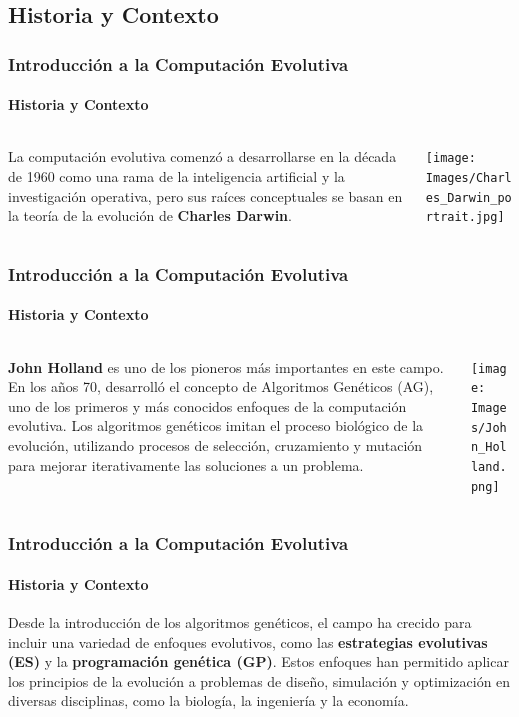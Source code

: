 \documentclass[
	11pt, %
]{beamer}
\begin{document}
\subsection{Historia y Contexto}
\begin{frame}
	\frametitle{Introducción a la Computación Evolutiva}
	\framesubtitle{Historia y Contexto}
	\begin{columns}[c] %
		\begin{column}{0.45\textwidth} %
                La computación evolutiva comenzó a desarrollarse en la década de 1960 como una rama de la inteligencia artificial y la investigación operativa, pero sus raíces conceptuales se basan en la teoría de la evolución de \textbf{Charles Darwin}.
		\end{column}
		\begin{column}{0.5\textwidth} %
			\texttt{[image: Images/Charles\_Darwin\_portrait.jpg]}
		\end{column}
	\end{columns}
\end{frame}

\begin{frame}
	\frametitle{Introducción a la Computación Evolutiva}
	\framesubtitle{Historia y Contexto}
	\begin{columns}[c] %
		\begin{column}{0.45\textwidth} %
                \textbf{John Holland} es uno de los pioneros más importantes en este campo. En los años 70, desarrolló el concepto de Algoritmos Genéticos (AG), uno de los primeros y más conocidos enfoques de la computación evolutiva. Los algoritmos genéticos imitan el proceso biológico de la evolución, utilizando procesos de selección, cruzamiento y mutación para mejorar iterativamente las soluciones a un problema.
		\end{column}
		\begin{column}{0.5\textwidth} %
			\texttt{[image: Images/John\_Holland.png]}
		\end{column}
	\end{columns}
\end{frame}

\begin{frame}
	\frametitle{Introducción a la Computación Evolutiva}
	\framesubtitle{Historia y Contexto}
        Desde la introducción de los algoritmos genéticos, el campo ha crecido para incluir una variedad de enfoques evolutivos, como las \textbf{estrategias evolutivas (ES)} y la \textbf{programación genética (GP)}. Estos enfoques han permitido aplicar los principios de la evolución a problemas de diseño, simulación y optimización en diversas disciplinas, como la biología, la ingeniería y la economía.
\end{frame}
\end{document}
